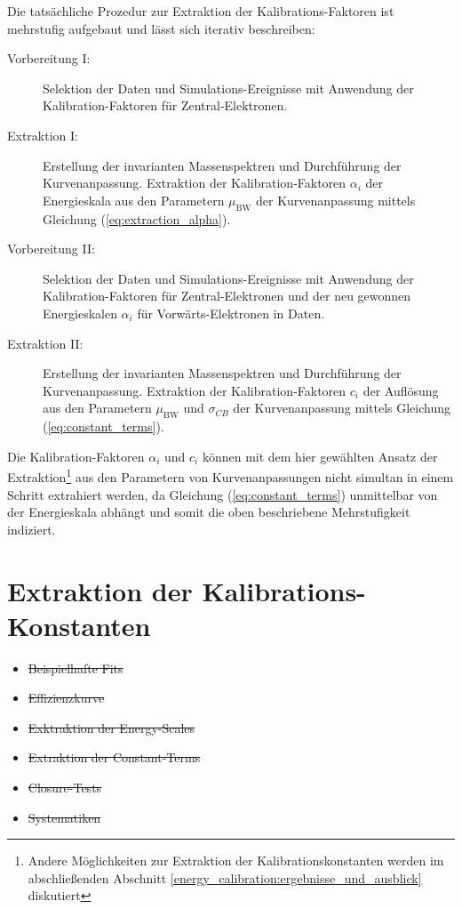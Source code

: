 Die tatsächliche Prozedur zur Extraktion der Kalibrations-Faktoren ist
mehrstufig aufgebaut und lässt sich iterativ beschreiben:
\begin{description}
    \item[Vorbereitung I:]
        Selektion der Daten und Simulations-Ereignisse mit Anwendung der
        Kalibration-Faktoren für Zentral-Elektronen.
    \item[Extraktion I:]
        Erstellung der invarianten Massenspektren und Durchführung der
        Kurvenanpassung. Extraktion der Kalibration-Faktoren $\alpha_i$ der
        Energieskala aus den Parametern $\mu_\text{BW}$ der Kurvenanpassung
        mittels Gleichung (\ref{eq:extraction_alpha}).
    \item[Vorbereitung II:]
        Selektion der Daten und Simulations-Ereignisse mit Anwendung der
        Kalibration-Faktoren für Zentral-Elektronen und der neu gewonnen
        Energieskalen $\alpha_i$ für Vorwärts-Elektronen in Daten.
    \item[Extraktion II:]
        Erstellung der invarianten Massenspektren und Durchführung der
        Kurvenanpassung. Extraktion der Kalibration-Faktoren $c_i$ der
        Auflösung aus den Parametern $\mu_\text{BW}$ und $\sigma_{CB}$ der
        Kurvenanpassung mittels Gleichung (\ref{eq:constant_terms}).
\end{description}
Die Kalibration-Faktoren $\alpha_i$ und $c_i$ können mit dem hier gewählten
Ansatz der Extraktion\footnote{Andere Möglichkeiten zur Extraktion der
Kalibrationskonstanten werden im abschließenden Abschnitt
\ref{energy_calibration:ergebnisse_und_ausblick} diskutiert} aus den Parametern
von Kurvenanpassungen nicht simultan in einem Schritt extrahiert werden, da
Gleichung (\ref{eq:constant_terms}) unmittelbar von der Energieskala abhängt
und somit die oben beschriebene Mehrstufigkeit indiziert.



%
\section{Extraktion der Kalibrations-Konstanten}
\label{energy_calibration:extraktion_der_kalibrations-konstanten}

\begin{itemize}
    \item \sout{Beispielhafte Fits}
    \item \sout{Effizienzkurve}
    \item \sout{Exktraktion der Energy-Scales}
    \item \sout{Extraktion der Constant-Terms}
    \item \sout{Closure-Tests}
    \item \sout{Systematiken}
\end{itemize}

